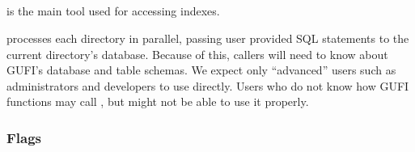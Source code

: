 \subsection{\gufiquery}

\gufiquery is the main tool used for accessing indexes.

\gufiquery processes each directory in parallel, passing user provided
SQL statements to the current directory's database. Because of this,
callers will need to know about GUFI's database and table schemas. We
expect only ``advanced'' users such as administrators and developers
to use \gufiquery directly. Users who do not know how GUFI functions
may call \gufiquery, but might not be able to use it properly.

\subsubsection{Flags}


